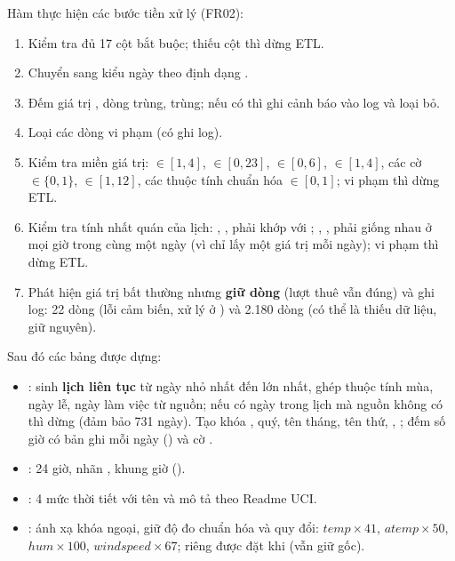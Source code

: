 Hàm  thực hiện các bước tiền xử lý (FR02):
\begin{enumerate}
    \item Kiểm tra đủ 17 cột bắt buộc; thiếu cột thì dừng ETL.
    \item Chuyển  sang kiểu ngày theo định dạng .
    \item Đếm giá trị , dòng trùng,  trùng; nếu có thì ghi cảnh báo vào log và loại bỏ.
    \item Loại các dòng vi phạm  (có ghi log).
    \item Kiểm tra miền giá trị:  $\in [1,4]$,  $\in [0,23]$,  $\in [0,6]$,  $\in [1,4]$, các cờ $\in \{0,1\}$,  $\in [1,12]$, các thuộc tính chuẩn hóa $\in [0,1]$; vi phạm thì dừng ETL.
    \item Kiểm tra tính nhất quán của lịch: , ,  phải khớp với ; , ,  phải giống nhau ở mọi giờ trong cùng một ngày (vì  chỉ lấy một giá trị mỗi ngày); vi phạm thì dừng ETL.
    \item Phát hiện giá trị bất thường nhưng \textbf{giữ dòng} (lượt thuê vẫn đúng) và ghi log: 22 dòng  (lỗi cảm biến, xử lý ở ) và 2.180 dòng  (có thể là thiếu dữ liệu, giữ nguyên).
\end{enumerate}
Sau đó các bảng được dựng:
\begin{itemize}
    \item {}: sinh \textbf{lịch liên tục} từ ngày nhỏ nhất đến lớn nhất, ghép thuộc tính mùa, ngày lễ, ngày làm việc từ nguồn; nếu có ngày trong lịch mà nguồn không có thì dừng (đảm bảo 731 ngày). Tạo khóa , quý, tên tháng, tên thứ, , ; đếm số giờ có bản ghi mỗi ngày () và cờ .
    \item {}: 24 giờ, nhãn , khung giờ ().
    \item {}: 4 mức thời tiết với tên và mô tả theo Readme UCI.
    \item {}: ánh xạ khóa ngoại, giữ độ đo chuẩn hóa và quy đổi: $temp \times 41$, $atemp \times 50$, $hum \times 100$, $windspeed \times 67$; riêng  được đặt  khi  (vẫn giữ  gốc).
\end{itemize}

